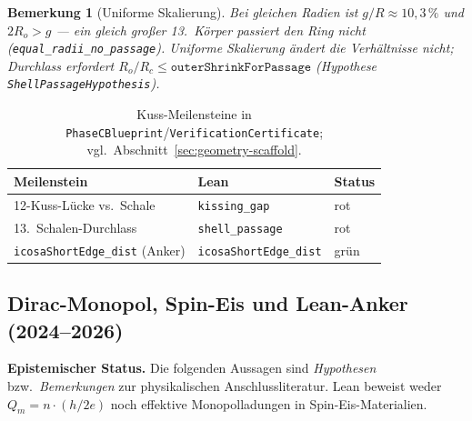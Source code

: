 \documentclass[11pt,a4paper]{article}
\newtheorem{remark}{Bemerkung}
\begin{document}
	\begin{remark}[Uniforme Skalierung]
		Bei gleichen Radien ist $g/R\approx 10{,}3\,\%$ und $2R_o>g$ --- ein gleich großer
		13.\ Körper passiert den Ring nicht (\texttt{equal\_radii\_no\_passage}).
		Uniforme Skalierung ändert die Verhältnisse nicht; Durchlass erfordert
		$R_o/R_c\le\texttt{outerShrinkForPassage}$ (Hypothese \texttt{ShellPassageHypothesis}).
	\end{remark}
	
	\begin{table}[h!]
		\centering
		\small
		\begin{tabular}{@{}lll@{}}
			\hline
			\textbf{Meilenstein} & \textbf{Lean} & \textbf{Status} \\
			\hline
			12-Kuss-Lücke vs.\ Schale & \texttt{kissing\_gap} & rot \\
			13.\ Schalen-Durchlass & \texttt{shell\_passage} & rot \\
			\texttt{icosaShortEdge\_dist} (Anker) & \texttt{icosaShortEdge\_dist} & grün \\
			\hline
		\end{tabular}
		\caption{Kuss-Meilensteine in \texttt{PhaseCBlueprint}/\texttt{VerificationCertificate};
			vgl.\ Abschnitt~\ref{sec:geometry-scaffold}.}
		\label{tab:kissing-milestones}
	\end{table}
	
	\subsection{Dirac-Monopol, Spin-Eis und Lean-Anker (2024--2026)}
	\label{sec:dirac-monopole}
	
	\textbf{Epistemischer Status.}
	Die folgenden Aussagen sind \emph{Hypothesen} bzw.\ \emph{Bemerkungen} zur
	physikalischen Anschlussliteratur. Lean beweist weder $Q_m = n \cdot (h/2e)$
	noch effektive Monopolladungen in Spin-Eis-Materialien.
	
\end{document}
